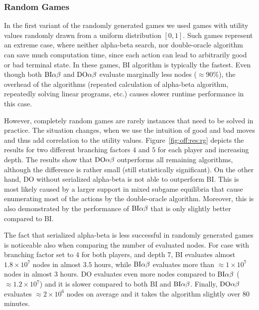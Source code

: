 \subsubsection{Random Games}

In the first variant of the randomly generated games we used games with utility values randomly drawn from a uniform distribution $[0,1]$. 
Such games represent an extreme case, where neither alpha-beta search, nor double-oracle algorithm can save much computation time, since each action can lead to arbitrarily good or bad terminal state. 
In these games, \textsc{BI} algorithm is typically the fastest.
Even though both $\textrm{BI}\alpha\beta$ and $\textrm{DO}\alpha\beta$ evaluate marginally less nodes ($\approx90\%$), the overhead of the algorithms (repeated calculation of alpha-beta algorithm, repeatedly solving linear programs, etc.) causes slower runtime performance in this case.

However, completely random games are rarely instances that need to be solved in practice.
The situation changes, when we use the intuition of good and bad moves and thus add correlation to the utility values.
Figure~\ref{fig:off:res:rg} depicts the results for two different branching factors $4$ and $5$ for each player and increasing depth.
The results show that $\textrm{DO}\alpha\beta$ outperforms all remaining algorithms, although the difference is rather small (still statistically significant).
On the other hand, \textsc{DO} without serialized alpha-beta is not able to outperform \textsc{BI}. 
This is most likely caused by a larger support in mixed subgame equilibria that cause enumerating most of the actions by the double-oracle algorithm. 
Moreover, this is also demonstrated by the performance of $\textrm{BI}\alpha\beta$ that is only slightly better compared to \textsc{BI}.

The fact that serialized alpha-beta is less successful in randomly generated games is noticeable also when comparing the number of evaluated nodes.
For case with branching factor set to $4$ for both players, and depth $7$, \textsc{BI} evaluates almost $1.8\times10^7$ nodes in almost $3.5$ hours, while $\textrm{BI}\alpha\beta$ evaluates more than $\approx1\times10^7$ nodes in almost $3$ hours. 
\textsc{DO} evaluates even more nodes compared to $\textrm{BI}\alpha\beta$ ($\approx1.2\times10^7$) and it is slower compared to both \textsc{BI} and $\textrm{BI}\alpha\beta$. 
Finally, $\textrm{DO}\alpha\beta$ evaluates $\approx2\times10^6$ nodes on average and it takes the algorithm slightly over $80$ minutes.

